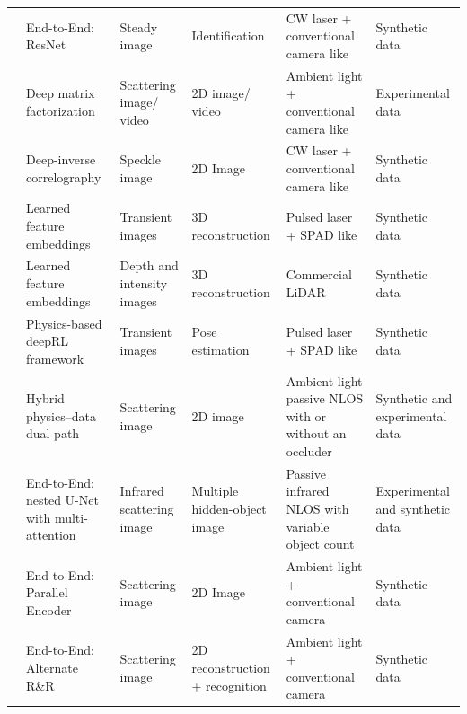 \begin{table}[!t]
{\begin{tabular}{>{\raggedright}m{1.5cm}m{2.3cm}m{2cm}m{2.7cm}m{4cm}m{3cm}}
   \cite{leiDirectObjectRecognition2019} & End-to-End: ResNet & Steady image & Identification &  CW laser + conventional camera like \cite{chenSteadystateNonLineofSightImaging2019} & Synthetic data\\ %
   \cite{aittalaComputationalMirrorsBlind2019} & Deep matrix factorization & Scattering image/ video & 2D image/ video &  Ambient light + conventional camera like \cite{saundersComputationalPeriscopyOrdinary2019} & Experimental data\\%
   \cite{metzlerDeepinverseCorrelographyRealtime2020} & Deep-inverse correlography & Speckle image & 2D Image &  CW laser + conventional camera like \cite{chenSteadystateNonLineofSightImaging2019} & Synthetic data\\%
   \cite{chen_learned_2020} & Learned feature embeddings & Transient images & 3D reconstruction &  Pulsed laser + SPAD like \cite{otooleConfocalNonlineofsightImaging2018} & Synthetic data\\%
   \cite{zhuFastNonlineofsightImaging2021a} & Learned feature embeddings & Depth and intensity images & 3D reconstruction &  Commercial LiDAR & Synthetic data\\%
   \cite{isogawaOpticalNonLineofSightPhysicsBased2020} & Physics-based deepRL framework & Transient images & Pose estimation &  Pulsed laser + SPAD like \cite{otooleConfocalNonlineofsightImaging2018} & Synthetic data\\ %
    \cite{liangHPDIPassiveNLOS2026} & Hybrid physics--data dual path & Scattering image & 2D image & Ambient-light passive NLOS with or without an occluder & Synthetic and experimental data\\%
    \cite{chenMultipleObjectPassiveNLOS2026} & End-to-End: nested U-Net with multi-attention & Infrared scattering image & Multiple hidden-object image & Passive infrared NLOS with variable object count & Experimental and synthetic data\\ %
   \cite{du2025passive} & End-to-End: Parallel Encoder & Scattering image & 2D Image &  Ambient light + conventional camera & Synthetic data\\ %
   \cite{wang2025nlos} & End-to-End: Alternate R\&R & Scattering image & 2D reconstruction + recognition &  Ambient light + conventional camera & Synthetic data\\ %

   \hline
   \end{tabular}}{}
   \end{table} %

